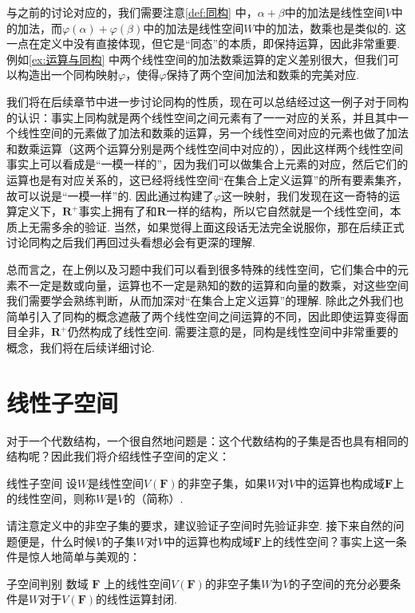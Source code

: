 与之前的讨论对应的，我们需要注意\autoref{def:同构} 中，$\alpha+\beta$中的加法是线性空间$V$中的加法，而$\varphi(\alpha)+\varphi(\beta)$中的加法是线性空间$W$中的加法，数乘也是类似的. 这一点在定义中没有直接体现，但它是``同态''的本质，即保持运算，因此非常重要. 例如\autoref{ex:运算与同构} 中两个线性空间的加法数乘运算的定义差别很大，但我们可以构造出一个同构映射$\varphi$，使得$\varphi$保持了两个空间加法和数乘的完美对应.

我们将在后续章节中进一步讨论同构的性质，现在可以总结经过这一例子对于同构的认识：事实上同构就是两个线性空间之间元素有了一一对应的关系，并且其中一个线性空间的元素做了加法和数乘的运算，另一个线性空间对应的元素也做了加法和数乘运算（这两个运算分别是两个线性空间中对应的），因此这样两个线性空间事实上可以看成是``一模一样的''，因为我们可以做集合上元素的对应，然后它们的运算也是有对应关系的，这已经将线性空间``在集合上定义运算''的所有要素集齐，故可以说是``一模一样''的. 因此通过构建了$\varphi$这一映射，我们发现在这一奇特的运算定义下，$\mathbf{R}^+$事实上拥有了和$\mathbf{R}$一样的结构，所以它自然就是一个线性空间，本质上无需多余的验证. 当然，如果觉得上面这段话无法完全说服你，那在后续正式讨论同构之后我们再回过头看想必会有更深的理解.

总而言之，在上例以及习题中我们可以看到很多特殊的线性空间，它们集合中的元素不一定是数或向量，运算也不一定是熟知的数的运算和向量的数乘，对这些空间我们需要学会熟练判断，从而加深对``在集合上定义运算''的理解. 除此之外我们也简单引入了同构的概念遮蔽了两个线性空间之间运算的不同，因此即使运算变得面目全非，$\mathbf{R}^+$仍然构成了线性空间. 需要注意的是，同构是线性空间中非常重要的概念，我们将在后续详细讨论.

\section{线性子空间}

对于一个代数结构，一个很自然地问题是：这个代数结构的子集是否也具有相同的结构呢？因此我们将介绍线性子空间的定义：
\begin{definition}{线性子空间}{} 
    设$W$是线性空间$V(\mathbf{F})$的非空子集，如果$W$对$V$中的运算也构成域$\mathbf{F}$上的线性空间，则称$W$是$V$的（简称）.
\end{definition}

请注意定义中的非空子集的要求，建议验证子空间时先验证非空. 接下来自然的问题便是，什么时候$V$的子集$W$对$V$中的运算也构成域$\mathbf{F}$上的线性空间？事实上这一条件是惊人地简单与美观的：
\begin{theorem}{}{子空间判别}
    数域 $\mathbf{F}$ 上的线性空间$V(\mathbf{F})$的非空子集$W$为$V$的子空间的充分必要条件是$W$对于$V(\mathbf{F})$的线性运算封闭.
\end{theorem}

